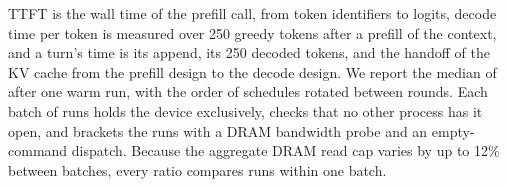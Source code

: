TTFT is the wall time of the prefill call, from token identifiers to logits, decode time per token is measured over 250 greedy tokens after a prefill of the context, and a turn's time is its append, its 250 decoded tokens, and the handoff of the KV cache from the prefill design to the decode design.
We report the median of  after one warm run, with the order of schedules rotated between rounds.
Each batch of runs holds the device exclusively, checks that no other process has it open, and brackets the runs with a DRAM bandwidth probe and an empty-command dispatch.
Because the aggregate DRAM read cap varies by up to 12\% between batches, every ratio compares runs within one batch.


